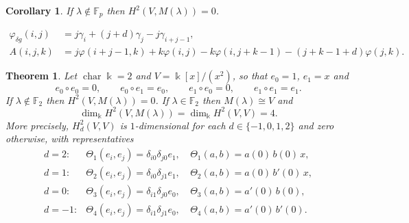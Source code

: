\documentclass[10pt,a4paper]{amsart}
\newtheorem{theorem}{Theorem}
\newtheorem{corollary}{Corollary}
\newcommand{\Fp}{\mathbb{F}_p}
\newcommand{\Ht}{H^2}
\newcommand{\kk}{\Bbbk}
\begin{document}
\begin{corollary}\label{cor:notinFp}
If $\lambda\notin\Fp$ then $\Ht(V,M(\lambda))=0$.
\end{corollary}

\begin{align}
\varphi_{\delta g}(i,j)&=j\gamma_i+(j+d)\gamma_j-j\gamma_{i+j-1},\label{eq:cobV}\\
A(i,j,k)&=j\varphi(i+j-1,k)+k\varphi(i,j)-k\varphi(i,j+k-1)-(j+k-1+d)\varphi(j,k).
\label{eq:C1V}
\end{align}

\begin{theorem}\label{thm:p2}
Let $\operatorname{char}\kk=2$ and $V=\kk[x]/(x^2)$, so that $e_0=1$, $e_1=x$ and
\[
e_0\circ e_0=0,\qquad e_0\circ e_1=e_0,\qquad e_1\circ e_0=0,\qquad e_1\circ e_1=e_1 .
\]
If $\lambda\notin\mathbb{F}_2$ then $\Ht(V,M(\lambda))=0$. If $\lambda\in\mathbb{F}_2$ then
$M(\lambda)\cong V$ and
\[
\dim_\kk\Ht(V,M(\lambda))=\dim_\kk\Ht(V,V)=4 .
\]
More precisely, $\Ht_d(V,V)$ is $1$-dimensional for each $d\in\{-1,0,1,2\}$ and zero
otherwise, with representatives
\[
\begin{array}{lll}
d=2: &\Theta_1(e_i,e_j)=\delta_{i0}\delta_{j0}e_1, &\ \Theta_1(a,b)=a(0)\,b(0)\,x,\\[2pt]
d=1: &\Theta_2(e_i,e_j)=\delta_{i0}\delta_{j1}e_1, &\ \Theta_2(a,b)=a(0)\,b'(0)\,x,\\[2pt]
d=0: &\Theta_3(e_i,e_j)=\delta_{i1}\delta_{j0}e_0, &\ \Theta_3(a,b)=a'(0)\,b(0),\\[2pt]
d=-1:&\Theta_4(e_i,e_j)=\delta_{i1}\delta_{j1}e_0, &\ \Theta_4(a,b)=a'(0)\,b'(0).
\end{array}
\]
\end{theorem}
\end{document}
